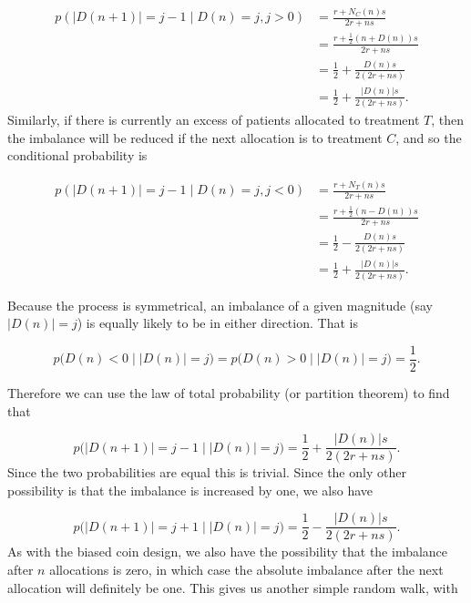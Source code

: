 \documentclass[
  openany]{book}
\theoremstyle{definition}
\theoremstyle{definition}
\theoremstyle{definition}
\theoremstyle{definition}
\theoremstyle{remark}
\begin{document}
\[
  \begin{aligned}
p\left(\lvert D\left(n+1\right)\rvert = j-1 \mid D\left(n\right)=j, j>0\right) & = \frac{r + N_C\left(n\right)s}{2r + ns} \\
& = \frac{r + \frac{1}{2}\left(n + D\left(n\right)\right)s}{2r + ns} \\
& = \frac{1}{2} + \frac{D\left(n\right)s}{2\left(2r + ns\right)} \\
& = \frac{1}{2} + \frac{\lvert D\left(n\right)\rvert s}{2\left(2r + ns\right)}.
\end{aligned}
\]
Similarly, if there is currently an excess of patients allocated to treatment \(T\), then the imbalance will be reduced if the next allocation is to treatment \(C\), and so the conditional probability is

\[
  \begin{aligned}
p\left(\lvert D\left(n+1\right)\rvert = j-1 \mid D\left(n\right)=j, j<0\right) & = \frac{r + N_T\left(n\right)s}{2r + ns} \\
& = \frac{r + \frac{1}{2}\left(n - D\left(n\right)\right)s}{2r + ns} \\
& = \frac{1}{2} - \frac{D\left(n\right)s}{2\left(2r + ns\right)}\\
& = \frac{1}{2} + \frac{\lvert D\left(n\right)\rvert s}{2\left(2r + ns\right)}.
\end{aligned}
\]

Because the process is symmetrical, an imbalance of a given magnitude (say \(\lvert D\left(n\right)\rvert=j\)) is equally likely to be in either direction. That is

\[p\big(D\left(n\right) < 0 \mid \lvert D\left(n\right)\rvert =j \big)= p\big(D\left(n\right) > 0 \mid \lvert D\left(n\right)\rvert =j \big) = \frac{1}{2}.\]

Therefore we can use the law of total probability (or partition theorem) to find that

\[
  p\big(\lvert D\left(n+1\right) \rvert = j-1 \mid \lvert D\left(n\right) \rvert = j \big) = \frac{1}{2}  + \frac{\lvert D\left(n\right)\rvert s}{2\left(2r + ns\right)}.
\]
Since the two probabilities are equal this is trivial. Since the only other possibility is that the imbalance is increased by one, we also have

\[p\big(\lvert D\left(n+1\right) \rvert = j+1 \mid \lvert D\left(n\right) \rvert = j \big) = \frac{1}{2}  - \frac{\lvert D\left(n\right)\rvert s}{2\left(2r + ns\right)}. \]
As with the biased coin design, we also have the possibility that the imbalance after \(n\) allocations is zero, in which case the absolute imbalance after the next allocation will definitely be one. This gives us another simple random walk, with
\end{document}
